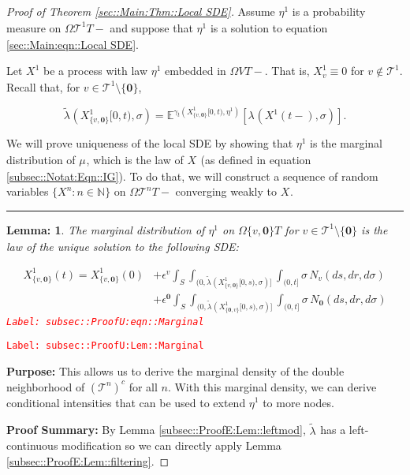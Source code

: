 \documentclass[12pt]{article}
\newcommand{\mb}{\mathbb}
\newcommand{\mc}{\mathcal}
\newcommand{\ep}{\epsilon}
\newcommand{\tr}{\textcolor{red}}
\newcommand{\labe}[1]{\tr{\texttt{Label: #1}}}
\newcommand{\purpose}{\textbf{Purpose: }}
\newcommand{\pfsum}{\textbf{Proof Summary: }}
\newcommand{\ind}{\hspace{24pt}}
\newcommand{\lin}{\rule{\linewidth}{0.4 pt}}
\newcommand{\exmu}[2]{\mb{E}^{#1}\left[#2\right]}	%
\renewcommand{\root}{\mathbf{0}}				%
\renewcommand{\v}{v}							%
\renewcommand{\S}{S}							%
\newcommand{\s}{\sigma}							%
\newcommand{\ev}[1]{\ep^{#1}}					%
\newcommand{\T}{T}								%
\renewcommand{\t}{t}							%
\renewcommand{\tt}{s}							%
\newcommand{\poiss}[1]{N_{#1}}						%
\newcommand{\pup}[1]{^{#1}}							%
\newcommand{\tree}{\mc{T}}							%
\newcommand{\V}{V}									%
\renewcommand{\r}{r}								%
\newcommand{\numb}{n}								%
\newcommand{\rxvtn}[3]{X_{#1}^{#3}(#2)}				%
\newcommand{\rxvts}[2]{X_{#1}{#2}}					%
\newcommand{\rxvtsn}[3]{X_{#1}^{#3}{#2}}			%
\newcommand{\m}[3]{\mu_{#2#1}^{#3}}						%
\newcommand{\mmm}[3]{\eta_{#2#1}^{#3}}						%
\newcommand{\cm}{\gamma}							%
\newcommand{\rate}[1]{\lambda_{#1}}					%
\newcommand{\crate}[2]{\alt{\lambda}_{#1}^{#2}}		%
\newcommand{\alt}{\widetilde}						%
\newtheorem{lem}[thms]{Lemma: }
\begin{document}
\begin{proof}[Proof of Theorem \ref{sec::Main:Thm::Local SDE}]

Assume \(\mmm{}{}{1}\) is a probability measure on \(\Omega{\tree\pup{1}}{\T-}\) and suppose that \(\mmm{}{}{1}\) is a solution to equation \eqref{sec::Main:eqn::Local SDE}.

\ind Let \(\rxvtsn{}{}{1}\) be a process with law \(\mmm{}{}{1}\) embedded in \(\Omega{\V}{\T-}\). That is, \(\rxvtsn{\v}{}{1} \equiv 0\) for \(\v \notin \tree\pup{1}\). Recall that, for \(\v \in \tree\pup{1}\setminus\{\root\}\),

\[\crate{}{}(\rxvtsn{\{\v,\root\}}{[0,\t)}{1},\s) = \exmu{\cm_\t(\rxvtsn{\{\v,\root\}}{[0,\t)}{1},\mmm{}{}{1})}{\rate{}(\rxvtn{}{\t-}{1},\s)}.\]

\ind We will prove uniqueness of the local SDE by showing that \(\mmm{}{}{1}\) is the marginal distribution of \(\m{}{}{}\), which is the law of \(\rxvts{}{}\) (as defined in equation \eqref{subsec::Notat:Eqn::IG}). To do that, we will construct a sequence of random variables \(\{\rxvtsn{}{}{\numb}:\numb\in\mb{N}\}\) on \(\Omega{\tree\pup{\numb}}{\T-}\) converging weakly to \(\rxvts{}{}\). 

\lin

\begin{lem}
The marginal distribution of \(\mmm{}{}{1}\) on \(\Omega{\{\v,\root\}}{\T}\) for \(\v \in \tree\pup{1}\setminus\{\root\}\) is the law of the unique solution to the following SDE:

\begin{align}
\rxvtn{\{\v,\root\}}{\t}{1} = \rxvtn{\{\v,\root\}}{0}{1} &+ \ev{\v}\int_\S\int_{(0,\crate{}{}(\rxvtsn{\{\v,\root\}}{[0,\tt)}{1},\s)]}\int_{(0,t]}\s\,\poiss{\v}(d\tt,d\r,d\s)\nonumber\\
&+ \ev{\root}\int_\S\int_{(0,\crate{}{}(\rxvtsn{\{\root,\v\}}{[0,\tt)}{1},\s)]}\int_{(0,t]}\s\,\poiss{\root}(d\tt,d\r,d\s)
\label{subsec::ProofU:eqn::Marginal}
\end{align}
\labe{subsec::ProofU:eqn::Marginal}
\label{subsec::ProofU:Lem::Marginal}
\end{lem}
\labe{subsec::ProofU:Lem::Marginal}

\purpose This allows us to derive the marginal density of the double neighborhood of \((\tree\pup{n})^c\) for all \(\numb\). With this marginal density, we can derive conditional intensities that can be used to extend \(\mmm{}{}{1}\) to more nodes.

\pfsum By Lemma \ref{subsec::ProofE:Lem::leftmod}, \(\crate{}{}\) has a left-continuous modification so we can directly apply Lemma \ref{subsec::ProofE:Lem::filtering}.


\end{proof}
\end{document}
